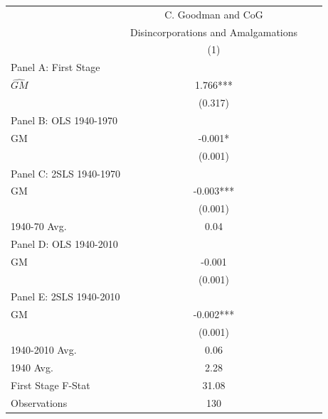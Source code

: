  \begin{tabular}{l*{3}{c}} \toprule
&\multicolumn{1}{c}{C. Goodman and CoG}\\\cmidrule(lr){2-2}
&\multicolumn{1}{c}{Disincorporations and Amalgamations}\\\cmidrule(lr){2-2}
&\multicolumn{1}{c}{(1)}\\
\cmidrule(lr){1-2}
\multicolumn{1}{l}{Panel A: First Stage}\\
\cmidrule(lr){1-2}
$\widehat{GM}$  &    1.766***\\
                &  (0.317)   \\
\cmidrule(lr){1-2}
\multicolumn{1}{l}{Panel B: OLS 1940-1970}\\
\cmidrule(lr){1-2}
GM              &   -0.001*  \\
                &  (0.001)   \\
\cmidrule(lr){1-2}
\multicolumn{1}{l}{Panel C: 2SLS 1940-1970}\\
\cmidrule(lr){1-2}
GM              &   -0.003***\\
                &  (0.001)   \\
\midrule
1940-70 Avg.    &     0.04   \\
\cmidrule(lr){1-2}
\multicolumn{1}{l}{Panel D: OLS 1940-2010}\\
\cmidrule(lr){1-2}
GM              &   -0.001   \\
                &  (0.001)   \\
\cmidrule(lr){1-2}
\multicolumn{1}{l}{Panel E: 2SLS 1940-2010}\\
\cmidrule(lr){1-2}
GM              &   -0.002***\\
                &  (0.001)   \\
\midrule
1940-2010 Avg.  &     0.06   \\
1940 Avg.       &     2.28   \\
First Stage F-Stat&    31.08   \\
Observations    &      130   \\
 \bottomrule \end{tabular}
